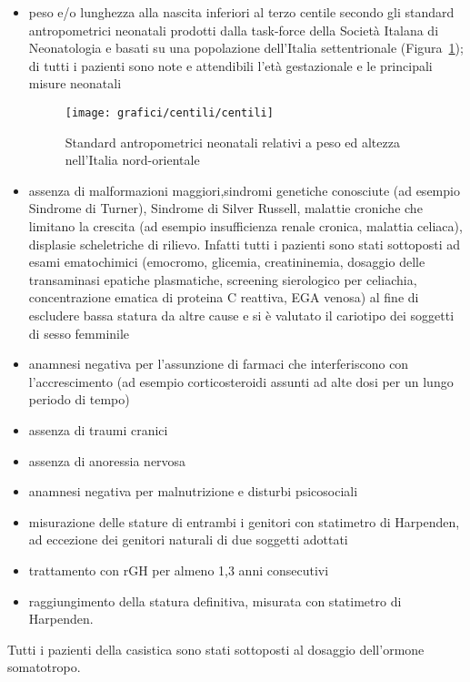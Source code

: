 \begin{itemize}
\item peso e/o lunghezza alla nascita inferiori al terzo centile secondo gli standard antropometrici neonatali prodotti dalla task-force della Società Italana di Neonatologia e basati su una popolazione dell'Italia settentrionale\cite{standard} (Figura~\ref{fig:StandardNeonataliNordOccidentali}); di tutti i pazienti sono note e attendibili l'età gestazionale e le principali misure neonatali
\begin{figure}[!h]
  \begin{center}
      \texttt{[image: grafici/centili/centili]} %
  \end{center}
  \caption{Standard antropometrici neonatali relativi a peso ed altezza nell'Italia nord-orientale}
  \label{fig:StandardNeonataliNordOccidentali}
\end{figure}
\item assenza di malformazioni maggiori,sindromi genetiche conosciute (ad esempio Sindrome di Turner), Sindrome di Silver Russell, malattie croniche che limitano la crescita (ad esempio insufficienza renale cronica, malattia celiaca), displasie scheletriche di rilievo. Infatti tutti i pazienti sono stati sottoposti ad esami ematochimici (emocromo, glicemia, creatininemia, dosaggio delle transaminasi epatiche plasmatiche, screening sierologico per celiachia, concentrazione ematica di proteina C reattiva, EGA venosa) al fine di escludere bassa statura da altre cause e si è valutato il cariotipo dei soggetti di sesso femminile
 \item anamnesi negativa per l'assunzione di farmaci che interferiscono con l'accrescimento (ad esempio corticosteroidi assunti ad alte dosi per un lungo periodo di tempo)
 \item assenza di traumi cranici
 \item assenza di anoressia nervosa
 \item anamnesi negativa per malnutrizione e disturbi psicosociali
 \item misurazione delle stature di entrambi i genitori con statimetro di Harpenden, ad eccezione dei genitori naturali di due soggetti adottati
\item trattamento con rGH per almeno 1,3 anni consecutivi
\item raggiungimento della statura definitiva, misurata con statimetro di Harpenden. 
\end{itemize}

Tutti i pazienti della casistica sono stati sottoposti al dosaggio dell'ormone somatotropo. 

